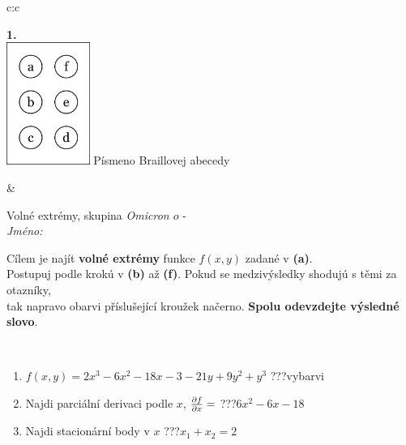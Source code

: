 \documentclass[10pt]{report}
\newcommand\omicron{o}
\begin{document}
\begin{tabular}{c:c}
\begin{minipage}[c][104.5mm][t]{0.5\linewidth}
\begin{center}
\begin{minipage}{0.20\linewidth}
\begin{center}
{\Huge\bfseries 1.} \\[2mm]
\includegraphics[height=40mm]{../images/braille.png}
{\small Písmeno Braillovej abecedy}
\end{center}
\end{minipage}
\end{center}
\end{minipage}
&
\begin{minipage}[c][104.5mm][t]{0.5\linewidth}
\begin{center}
\vspace{7mm}
{\huge Volné extrémy, skupina \textit{Omicron $\omicron$} -}\\[5mm]
\textit{Jméno:}\phantom{xxxxxxxxxxxxxxxxxxxxxxxxxxxxxxxxxxxxxxxxxxxxxxxxxxxxxxxxxxxxxxxxx}\\[5mm]
\begin{minipage}{0.95\linewidth}
\begin{center}
Cílem je najít \textbf{volné extrémy} funkce $f(x,y)$ zadané v \textbf{(a)}.\\Postupuj podle krokú v \textbf{(b)} až \textbf{(f)}. Pokud se medzivýsledky shodujú s těmi za otazníky,\\tak napravo obarvi příslušející kroužek načerno. \textbf{Spolu odevzdejte výsledné slovo}.
\end{center}
\end{minipage}
\\[1mm]
\begin{minipage}{0.79\linewidth}
\begin{center}
\begin{varwidth}{\linewidth}
\begin{enumerate}
\normalsize
\item $f(x,y)=2x^3-6x^2-18x-3-21y+9y^2+y^3$\quad \dotfill\; ???\;\dotfill \quad vybarvi
\item Najdi parciální derivaci podle $x$, $\pdv{f}{x}=$\quad \dotfill\; ???\;\dotfill \quad $6x^2-6x-18$
\item Najdi stacionární body v $x$\quad \dotfill\; ???\;\dotfill \quad $x_1+x_2=2$

\end{enumerate}
\end{varwidth}
\end{center}
\end{minipage}
\end{center}
\end{minipage}
\end{tabular}
\end{document}
